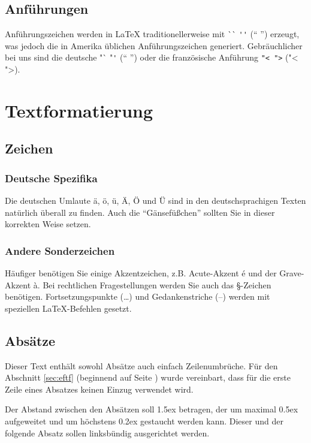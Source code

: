 \documentclass[11pt, a4paper]{article}
\newcommand{\ltx}{\LaTeX}
\begin{document}
\subsection{Anführungen}
Anführungszeichen werden in \ltx{} traditionellerweise mit \`{}\`{} \verb+''+ (`` '') erzeugt, was jedoch die in Amerika üblichen Anführungszeichen generiert. Gebräuchlicher bei uns sind die deutsche "\`{} "\verb+'+ ("` "') oder die französische Anführung \verb+"< ">+ ("< ">).

\begingroup
\setlength{\parindent}{0pt}
\setlength{\parskip}{1.5ex plus 0.5ex minus 0.2ex}
\section{Textformatierung\label{sec:eftf}}

\subsection{Zeichen}

\subsubsection{Deutsche Spezifika}
Die deutschen Umlaute ä, ö, ü, Ä, Ö und Ü sind in den deutschsprachigen Texten natürlich überall zu finden. Auch die "`Gänsefü\ss chen"' sollten Sie in dieser korrekten Weise setzen.

\subsubsection{Andere Sonderzeichen}
Häufiger benötigen Sie einige Akzentzeichen, z.B. Acute-Akzent é und der Grave-Akzent à. Bei rechtlichen Fragestellungen werden Sie auch das §-Zeichen benötigen. Fortsetzungspunkte (\dots) und Gedankenstriche (--) werden mit speziellen \ltx-Befehlen gesetzt.

\subsection{Absätze}
Dieser Text enthält sowohl Absätze auch einfach Zeilenumbrüche. Für den Abschnitt \ref{sec:eftf} (beginnend auf Seite \pageref{sec:eftf}) wurde vereinbart, dass für die erste Zeile eines Absatzes keinen Einzug verwendet wird.

\begingroup
\raggedright %
Der Abstand zwischen den Absätzen soll 1.5ex betragen, der um maximal 0.5ex aufgeweitet und um höchstens 0.2ex gestaucht werden kann. Dieser und der folgende Absatz sollen linksbündig ausgerichtet werden.
\end{document}
